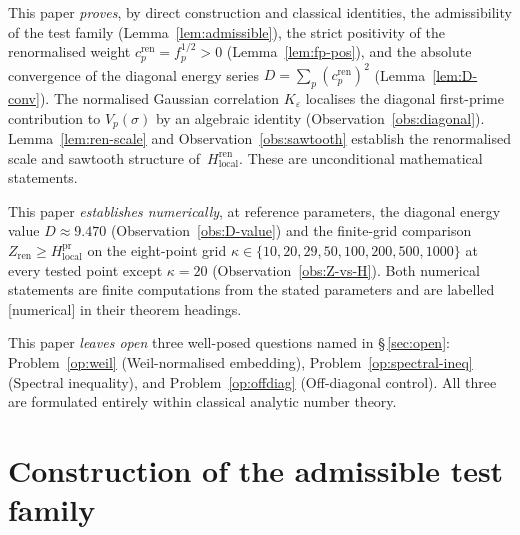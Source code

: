 \documentclass[11pt]{article}
\newcommand{\Hlocal}{H_{\mathrm{local}}}
\newcommand{\Hren}{H_{\mathrm{local}}^{\mathrm{ren}}}
\newcommand{\cren}{c_p^{\mathrm{ren}}}
\newcommand{\Zren}{Z_{\mathrm{ren}}}
\begin{document}
This paper \emph{proves}, by direct construction and classical
identities, the admissibility of the test family
(Lemma~\ref{lem:admissible}), the strict positivity
of the renormalised weight $\cren=f_p^{1/2}>0$
(Lemma~\ref{lem:fp-pos}), and the absolute convergence of the
diagonal energy series $D=\sum_p(\cren)^2$
(Lemma~\ref{lem:D-conv}).
The normalised Gaussian correlation $K_\varepsilon$ localises
the diagonal first-prime contribution to $V_p(\sigma)$ by an
algebraic identity (Observation~\ref{obs:diagonal}).
Lemma~\ref{lem:ren-scale} and Observation~\ref{obs:sawtooth}
establish the renormalised scale and sawtooth structure
of~$\Hren$.
These are unconditional mathematical statements.

This paper \emph{establishes numerically}, at reference
parameters, the diagonal energy value $D\approx 9.470$
(Observation~\ref{obs:D-value}) and the finite-grid comparison
$\Zren\ge\Hlocal^{\mathrm{pr}}$ on the eight-point grid
$\kappa\in\{10,20,29,50,100,200,500,1000\}$ at every tested
point except $\kappa=20$ (Observation~\ref{obs:Z-vs-H}).
Both numerical statements are finite computations from the
stated parameters and are labelled [numerical] in their theorem
headings.

This paper \emph{leaves open} three well-posed questions named in
\S\,\ref{sec:open}:
Problem~\ref{op:weil} (Weil-normalised embedding),
Problem~\ref{op:spectral-ineq} (Spectral inequality), and
Problem~\ref{op:offdiag} (Off-diagonal control).
All three are formulated entirely within classical analytic number
theory.

\section{Construction of the admissible test family}
\label{sec:construct}
\end{document}
